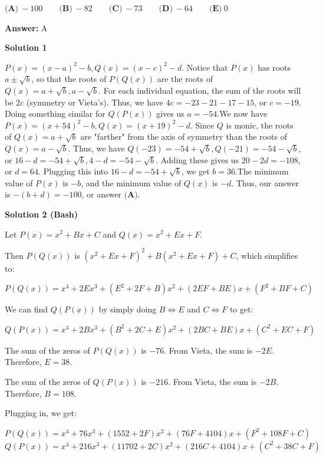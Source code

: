 \begin{enumerate}
 $\textbf{(A)}\ -100 \qquad \textbf{(B)}\ -82 \qquad \textbf{(C)}\ -73 \qquad \textbf{(D)}\ -64 \qquad \textbf{(E)}\ 0$

 \textbf{Answer: }A



\textbf{Solution 1}

$P(x) = (x - a)^2 - b, Q(x) = (x - c)^2 - d$. Notice that $P(x)$ has roots $a\pm \sqrt {b}$, so that the roots of $P(Q(x))$ are the roots of $Q(x) = a + \sqrt {b}, a - \sqrt {b}$. For each individual equation, the sum of the roots will be $2c$ (symmetry or Vieta's). Thus, we have $4c = - 23 - 21 - 17 - 15$, or $c = - 19$. Doing something similar for $Q(P(x))$ gives us $a = - 54$.We now have $P(x) = (x + 54)^2 - b, Q(x) = (x + 19)^2 - d$. Since $Q$ is monic, the roots of $Q(x) = a + \sqrt {b}$ are "farther" from the axis of symmetry than the roots of $Q(x) = a - \sqrt {b}$. Thus, we have $Q( - 23) = - 54 + \sqrt {b}, Q( -21) =- 54 - \sqrt {b}$, or $16 - d = - 54 + \sqrt {b}, 4 - d = - 54 - \sqrt {b}$. Adding these gives us $20 - 2d = - 108$, or $d = 64$. Plugging this into $16 - d = - 54 + \sqrt {b}$, we get $b = 36$.The minimum value of $P(x)$ is $- b$, and the minimum value of $Q(x)$ is $- d$. Thus, our answer is $- (b + d) = - 100$, or answer $\boxed{\textbf{(A)}}$.

 


 



\textbf{Solution 2 (Bash)}

Let $P(x) = x^2 + Bx + C$ and $Q(x) = x^2 + Ex + F$.

 Then $P(Q(x))$ is $(x^2 + Ex + F)^2 + B(x^2 + Ex + F) + C$, which simplifies to:

 $P(Q(x)) = x^4 + 2Ex^3 + (E^2 + 2F + B)x^2 + (2EF + BE)x + (F^2 + BF + C)$

 We can find $Q(P(x))$ by simply doing $B\Leftrightarrow E$ and $C \Leftrightarrow F$ to get:

 $Q(P(x)) = x^4 + 2Bx^3 + (B^2 + 2C + E)x^2 + (2BC + BE)x + (C^2 + EC + F)$

 The sum of the zeros of $P(Q(x))$ is $-76$. From Vieta, the sum is $-2E$. Therefore, $E = 38$.

 The sum of the zeros of $Q(P(x))$ is $-216$. From Vieta, the sum is $-2B$. Therefore, $B = 108$.

 Plugging in, we get:

 $P(Q(x)) = x^4 + 76x^3 + (1552 + 2F)x^2 + (76F + 4104)x + (F^2 + 108F + C)$$Q(P(x)) = x^4 + 216x^3 + (11702 + 2C)x^2 + (216C + 4104)x + (C^2 + 38C + F)$


\end{enumerate}
